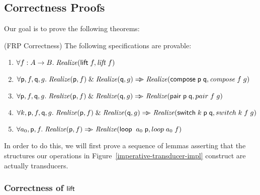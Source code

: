 \subsection{Correctness Proofs}

Our goal is to prove the following theorems:

\begin{prop}{(FRP Correctness)}
The following specifications are provable: 
\begin{enumerate}
\item $\forall f:A\to B.\; \mathit{Realize}(\mathsf{lift}\; f, \mathit{lift}\;f)$
\item $\forall \mathsf{p}, f, \mathsf{q}, g.\;\mathit{Realize}(\mathsf{p}, f) \;\&\; \mathit{Realize}(\mathsf{q}, g) \Rightarrow\!\!\!> \mathit{Realize}(\mathsf{compose}\; \mathsf{p\;q}, \mathit{compose}\;f\;g)$
\item $\forall \mathsf{p}, f, \mathsf{q}, g.\;\mathit{Realize}(\mathsf{p}, f) \;\&\; \mathit{Realize}(\mathsf{q}, g)
                       \Rightarrow\!\!\!> \mathit{Realize}(\mathsf{pair}\; \mathsf{p\;q}, pair\;f\;g)$
\item $\forall k, \mathsf{p}, f, \mathsf{q}, g.\;\mathit{Realize}(\mathsf{p}, f) \;\&\; \mathit{Realize}(\mathsf{q}, g)
                          \Rightarrow\!\!\!> \mathit{Realize}(\mathsf{switch}\; k\;\mathsf{p\;q}, switch\;k\;f\;g)$
\item $\forall a_0, \mathsf{p}, f.\; \mathit{Realize}(\mathsf{p}, f) \Rightarrow\!\!\!> \mathit{Realize}(\mathsf{loop}\;\;a_0\;\mathsf{p}, loop\;a_0\;f)$
\end{enumerate}
\end{prop}

\noindent In order to do this, we will first prove a sequence of
lemmas asserting that the structures our operations in
Figure~\ref{imperative-transducer-impl} construct are actually transducers. 

\subsubsection{Correctness of $\mathsf{lift}\;$}

